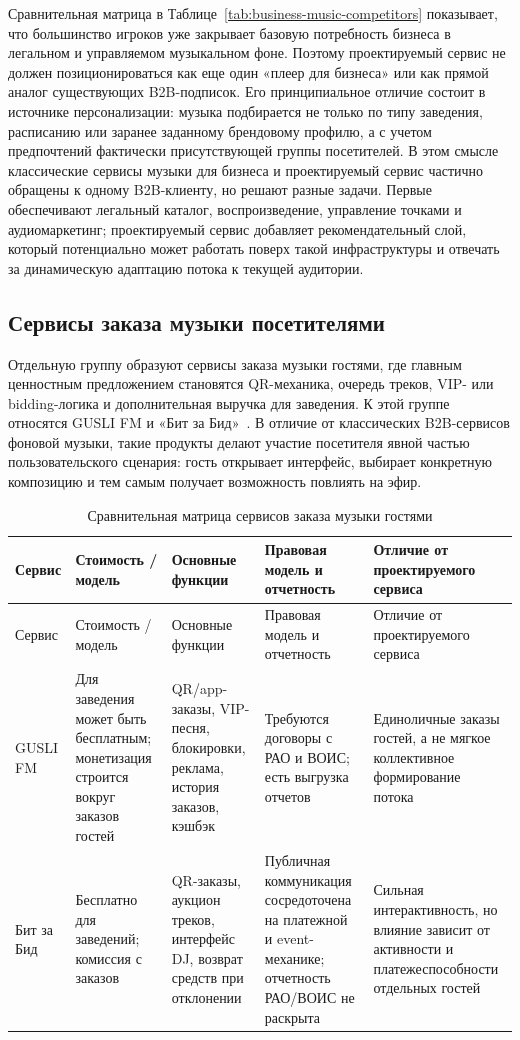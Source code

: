 Сравнительная матрица в Таблице~\ref{tab:business-music-competitors} показывает, что большинство игроков уже закрывает базовую потребность бизнеса в легальном и управляемом музыкальном фоне. Поэтому проектируемый сервис не должен позиционироваться как еще один «плеер для бизнеса» или как прямой аналог существующих B2B-подписок. Его принципиальное отличие состоит в источнике персонализации: музыка подбирается не только по типу заведения, расписанию или заранее заданному брендовому профилю, а с учетом предпочтений фактически присутствующей группы посетителей. В этом смысле классические сервисы музыки для бизнеса и проектируемый сервис частично обращены к одному B2B-клиенту, но решают разные задачи. Первые обеспечивают легальный каталог, воспроизведение, управление точками и аудиомаркетинг; проектируемый сервис добавляет рекомендательный слой, который потенциально может работать поверх такой инфраструктуры и отвечать за динамическую адаптацию потока к текущей аудитории.

\subsection{Сервисы заказа музыки посетителями}

Отдельную группу образуют сервисы заказа музыки гостями, где главным ценностным предложением становятся QR-механика, очередь треков, VIP- или bidding-логика и дополнительная выручка для заведения. К этой группе относятся GUSLI FM и «Бит за Бид»~\cite{gusli_site,bitzabid_site}. В отличие от классических B2B-сервисов фоновой музыки, такие продукты делают участие посетителя явной частью пользовательского сценария: гость открывает интерфейс, выбирает конкретную композицию и тем самым получает возможность повлиять на эфир.

\begingroup
\small
\singlespacing
\setlength{\tabcolsep}{3pt}
\begin{longtable}{p{}p{}p{}p{}p{}}
\caption{Сравнительная матрица сервисов заказа музыки гостями}
\label{tab:ordering-competitors}\\
\toprule
Сервис & Стоимость / модель & Основные функции & Правовая модель и отчетность & Отличие от проектируемого сервиса \\
\midrule
\endfirsthead
\toprule
Сервис & Стоимость / модель & Основные функции & Правовая модель и отчетность & Отличие от проектируемого сервиса \\
\midrule
\endhead
GUSLI FM & Для заведения может быть бесплатным; монетизация строится вокруг заказов гостей & QR/app-заказы, VIP-песня, блокировки, реклама, история заказов, кэшбэк & Требуются договоры с РАО и ВОИС; есть выгрузка отчетов & Единоличные заказы гостей, а не мягкое коллективное формирование потока \\
\addlinespace
Бит за Бид & Бесплатно для заведений; комиссия с заказов & QR-заказы, аукцион треков, интерфейс DJ, возврат средств при отклонении & Публичная коммуникация сосредоточена на платежной и event-механике; отчетность РАО/ВОИС не раскрыта & Сильная интерактивность, но влияние зависит от активности и платежеспособности отдельных гостей \\
\bottomrule
\end{longtable}
\endgroup

